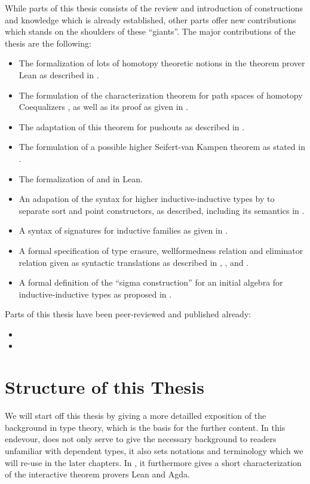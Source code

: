 While parts of this thesis consists of the review and introduction of constructions
and knowledge which is already established,
other parts offer new contributions which stands on the shoulders of these ``giants''.
The major contributions of the thesis are the following:
\begin{itemize}
\item The formalization of lots of homotopy theoretic notions in the theorem prover
Lean as described in .
\item The formulation of the characterization theorem for path spaces
of homotopy Coequalizers , as well as its proof
as given in .
\item The adaptation of this theorem for pushouts as described in .
\item The formulation of a possible higher Seifert-van Kampen theorem
as stated in .
\item The formalization of  and 
in Lean.
\item An adapation of the syntax for higher inductive-inductive types by
\citet{ambrussyntax} to separate sort and point constructors, as described, including
its semantics in .
\item A syntax of signatures for inductive families as given in .
\item A formal specification of type erasure, wellformedness relation and eliminator
relation given as syntactic translations as described in ,
, and .
\item A formal definition of the ``sigma construction'' for an initial algebra
for inductive-inductive types as proposed in .
\end{itemize}

Parts of this thesis have been peer-reviewed and published already:
\begin{itemize}
\item {}
\item {}
\end{itemize}

\section{Structure of this Thesis}

We will start off this thesis by giving a more detailled exposition of the
background in type theory, which is the basis for the further content.
In this endevour,  does not only serve to give the necessary background
to readers unfamiliar with dependent types, it also sets notations and terminology
which we will re-use in the later chapters.
In , it furthermore gives a short characterization of the interactive
theorem provers Lean and Agda.

